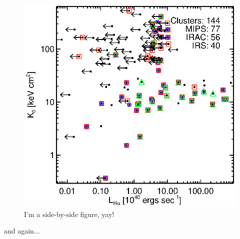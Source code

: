 \documentclass[letterpaper,11pt,onecolumn]{article}
\begin{document}
\begin{figure}[ht]
    \hspace{0cm}             %
    \begin{minipage}[b]{0.5\linewidth}
        \centering
        \includegraphics*[scale=0.75, trim=30mm 15mm 30mm 15mm, clip]{spitzer_hak0}
        \caption{I'm a side-by-side figure, yay!}
        \label{fig:figure2}
    \end{minipage}
\end{figure}

and again...
\end{document}
